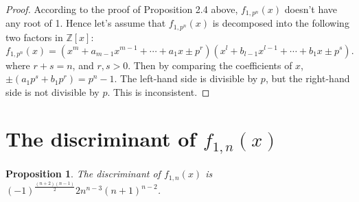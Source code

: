 \documentclass{article}
\newtheorem{prop}{Proposition}[section]
\begin{document}
\begin{proof}
According to the proof of Proposition 2.4 above, $f_{1,p^{n}}(x)$ doesn't have any root of 1. Hence let's assume that $f_{1,p^{n}}(x)$ is decomposed into the following two factors in $\mathbb{Z}[x]$:
\begin{equation}
f_{1,p^{n}}(x)=(x^{m}+a_{m-1}x^{m-1}+\cdots +a_{1}x \pm p^{r})(x^{l}+b_{l-1}x^{l-1}+\cdots +b_{1}x \pm p^{s}).
\end{equation}
where $r+s=n$, and $r, s >0$.
Then by comparing the coefficients of $x$, $\pm(a_{1}p^{s}+b_{1}p^{r}) = p^{n}-1$. The left-hand side is divisible by $p$, but the right-hand side is not divisible by $p$. This is inconsistent.

\end{proof}




\section{The discriminant of $f_{1,n}(x)$}

\begin{prop}
The discriminant of $f_{1,n}(x)$ is $(-1)^{\frac{(n+2)(n-1)}{2}}2n^{n-3}(n+1)^{n-2}$.
\end{prop}
\end{document}
